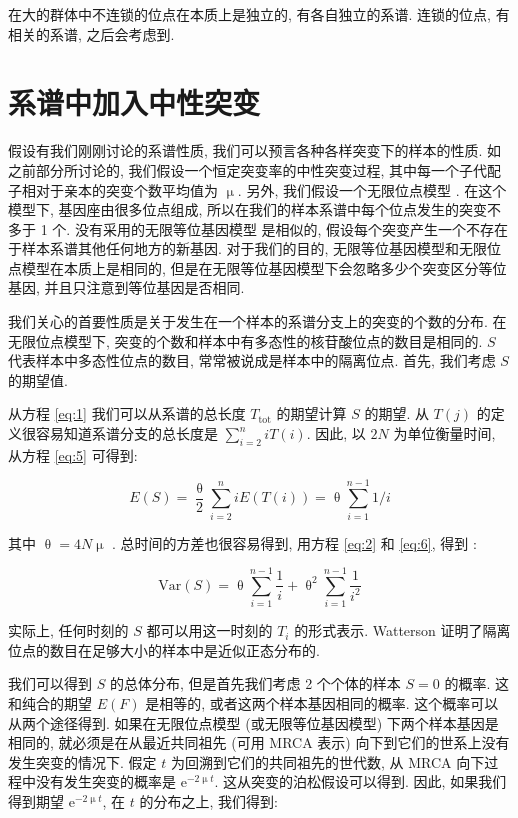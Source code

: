 \documentclass[12pt]{article}
\begin{document}
在大的群体中不连锁的位点在本质上是独立的, 有各自独立的系谱. 连锁的位点, 有相关的系谱, 之后会考虑到.

\section{系谱中加入中性突变}

假设有我们刚刚讨论的系谱性质, 我们可以预言各种各样突变下的样本的性质.
如之前部分所讨论的, 我们假设一个恒定突变率的中性突变过程, 其中每一个子代配子相对于亲本的突变个数平均值为 $\upmu$.
另外, 我们假设一个无限位点模型 \parencite{kimura1969}.
在这个模型下, 基因座由很多位点组成, 所以在我们的样本系谱中每个位点发生的突变不多于 1 个.
没有采用的无限等位基因模型 \parencite{kimura1964} 是相似的, 假设每个突变产生一个不存在于样本系谱其他任何地方的新基因.
对于我们的目的, 无限等位基因模型和无限位点模型在本质上是相同的,
但是在无限等位基因模型下会忽略多少个突变区分等位基因, 并且只注意到等位基因是否相同.

我们关心的首要性质是关于发生在一个样本的系谱分支上的突变的个数的分布.
在无限位点模型下, 突变的个数和样本中有多态性的核苷酸位点的数目是相同的.
$S$ 代表样本中多态性位点的数目, 常常被说成是样本中的隔离位点.
首先, 我们考虑 $S$ 的期望值.

从方程 \ref{eq:1} 我们可以从系谱的总长度 $T_{\text{tot}}$ 的期望计算 $S$ 的期望.
从 $T(j)$ 的定义很容易知道系谱分支的总长度是 $\sum_{i=2}^{n} i T(i)$.
因此, 以 $2N$ 为单位衡量时间, 从方程 \ref{eq:5} 可得到:

\begin{equation} \label{eq:6}
    E(S)=\frac{\uptheta}{2} \sum_{i=2}^{n} iE(T(i)) = \uptheta \sum_{i=1}^{n-1}1/i
\end{equation}

其中 $\uptheta = 4N \upmu$ \parencite{watterson1975}.
总时间的方差也很容易得到, 用方程 \ref{eq:2} 和 \ref{eq:6}, 得到 \parencite{watterson1975}:

\begin{equation} \label{eq:7}
    \text{Var}(S) = \uptheta \sum_{i=1}^{n-1} \frac{1}{i} + \uptheta^{2} \sum_{i=1}^{n-1} \frac{1}{i^{2}}
\end{equation}

实际上, 任何时刻的 $S$ 都可以用这一时刻的 $T_{i}$ 的形式表示.
Watterson 证明了隔离位点的数目在足够大小的样本中是近似正态分布的.

我们可以得到 $S$ 的总体分布, 但是首先我们考虑 2 个个体的样本 $S=0$ 的概率.
这和纯合的期望 $E(F)$ 是相等的, 或者这两个样本基因相同的概率. 这个概率可以从两个途径得到.
如果在无限位点模型 (或无限等位基因模型) 下两个样本基因是相同的,
就必须是在从最近共同祖先 (可用 MRCA 表示) 向下到它们的世系上没有发生突变的情况下.
假定 $t$ 为回溯到它们的共同祖先的世代数, 从 MRCA 向下过程中没有发生突变的概率是 $\mathrm{e}^{-2\upmu t}$.
这从突变的泊松假设可以得到. 因此, 如果我们得到期望 $\mathrm{e}^{-2\upmu t}$, 在 $t$ 的分布之上, 我们得到:
\end{document}
